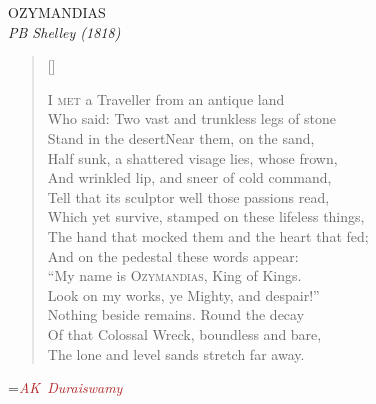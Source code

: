 \documentclass[a5paper,*pt,final]{memoir}
\newcommand{\h}[1]{\textcolor{FireBrick}{#1}}
\newcommand{\placetextbox}[3]{%
    \setbox0=\hbox{#3}%
    \AddToShipoutPictureFG*{%
        \put(\LenToUnit{#1\paperwidth},\LenToUnit{#2\paperheight}){\vtop{{\null}\parbox{2.3cm}{\raggedright #3}}}%
    }%
}
\begin{document}
\pagecolor{bblue}
\thispagestyle{empty}
\large


\begin{center}\Large
\uppercase{ozymandias}\\
\vskip0.2cm
{\normalsize \emph{PB Shelley (1818)}}
\end{center}

 \large

\settowidth{\versewidth}{i met a traveller from an antique land}
\begin{verse}[\versewidth]
\verselinenumbersleft
{}
\vskip0.2cm

\textsc{I met} a Traveller from an antique land\\
 Who said: Two vast and trunkless legs of stone\\
 Stand in the desert\textellipsis Near them, on the sand,\\
 Half sunk, a shattered visage lies, whose frown,\\
 And wrinkled lip, and sneer of cold command,\\
 Tell that its sculptor well those passions read,\\
 Which yet survive, stamped on these lifeless things,\\
 The hand that mocked them and the heart that fed;\\

 And on the pedestal these words appear:\\
 ``My name is \textsc{Ozymandias,} King of Kings.\\
 Look on my works, ye Mighty, and despair!''\\
 Nothing beside remains. Round the decay\\
 Of that Colossal Wreck, boundless and bare,\\
 The lone and level sands stretch far away.\h{}\hfil\\

\end{verse}
\vskip1.2cm



\placetextbox{0.037}{.05}{\tiny\emph{\h{AK Duraiswamy}}}%
\vspace*{\fill}
\end{document}
